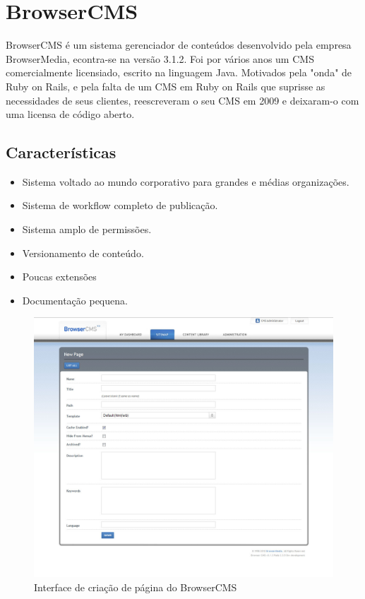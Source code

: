\section{BrowserCMS}

BrowserCMS é um sistema gerenciador de conteúdos desenvolvido pela empresa BrowserMedia, econtra-se na versão 3.1.2. Foi por vários anos um CMS comercialmente licensiado, escrito na linguagem Java. Motivados pela "onda" de Ruby on Rails, e pela falta de um CMS em Ruby on Rails que suprisse as necessidades de seus clientes, reescreveram o seu CMS em 2009 e deixaram-o com uma licensa de código aberto.

\subsection{Características}

\begin{itemize}
  \item Sistema voltado ao mundo corporativo para grandes e médias organizações.
  \item Sistema de workflow completo de publicação.
  \item Sistema amplo de permissões.
  \item Versionamento de conteúdo.
  \item Poucas extensões 
  \item Documentação pequena.
\end{itemize}

\begin{figure}[here]
\includegraphics[width=150mm]{images/browser_cms_new_page.jpg}
\caption{Interface de criação de página do BrowserCMS}
\label{fig:browsercms_new_page.png}
\end{figure}

